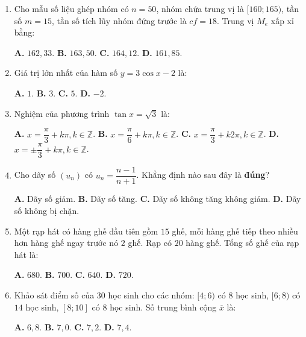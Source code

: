 \documentclass[12pt, a4paper]{article}
\begin{document}
\begin{enumerate}[leftmargin=1.5em]
    \item Cho mẫu số liệu ghép nhóm có $n = 50$, nhóm chứa trung vị là $[160; 165)$, tần số $m = 15$, tần số tích lũy nhóm đứng trước là $cf = 18$. Trung vị $M_e$ xấp xỉ bằng:
    \begin{center}
    \textbf{A.} $162{,}33$. \qquad \textbf{B.} $163{,}50$. \qquad \textbf{C.} $164{,}12$. \qquad \textbf{D.} $161{,}85$.
    \end{center}

    \item Giá trị lớn nhất của hàm số $y = 3\cos x - 2$ là:
    \begin{center}
    \textbf{A.} $1$. \qquad \textbf{B.} $3$. \qquad \textbf{C.} $5$. \qquad \textbf{D.} $-2$.
    \end{center}

    \item Nghiệm của phương trình $\tan x = \sqrt{3}$ là:
    \begin{center}
    \textbf{A.} $x = \dfrac{\pi}{3} + k\pi, k \in \mathbb{Z}$. \qquad \textbf{B.} $x = \dfrac{\pi}{6} + k\pi, k \in \mathbb{Z}$. \qquad \textbf{C.} $x = \dfrac{\pi}{3} + k2\pi, k \in \mathbb{Z}$. \qquad \textbf{D.} $x = \pm\dfrac{\pi}{3} + k\pi, k \in \mathbb{Z}$.
    \end{center}

    \item Cho dãy số $(u_n)$ có $u_n = \dfrac{n - 1}{n + 1}$. Khẳng định nào sau đây là \textbf{đúng}?
    \begin{center}
    \textbf{A.} Dãy số giảm. \qquad \textbf{B.} Dãy số tăng. \qquad \textbf{C.} Dãy số không tăng không giảm. \qquad \textbf{D.} Dãy số không bị chặn.
    \end{center}

    \item Một rạp hát có hàng ghế đầu tiên gồm $15$ ghế, mỗi hàng ghế tiếp theo nhiều hơn hàng ghế ngay trước nó $2$ ghế. Rạp có $20$ hàng ghế. Tổng số ghế của rạp hát là:
    \begin{center}
    \textbf{A.} $680$. \qquad \textbf{B.} $700$. \qquad \textbf{C.} $640$. \qquad \textbf{D.} $720$.
    \end{center}

    \item Khảo sát điểm số của $30$ học sinh cho các nhóm: $[4; 6)$ có $8$ học sinh, $[6; 8)$ có $14$ học sinh, $[8; 10]$ có $8$ học sinh. Số trung bình cộng $\overline{x}$ là:
    \begin{center}
    \textbf{A.} $6{,}8$. \qquad \textbf{B.} $7{,}0$. \qquad \textbf{C.} $7{,}2$. \qquad \textbf{D.} $7{,}4$.
    \end{center}


\end{enumerate}
\end{document}
